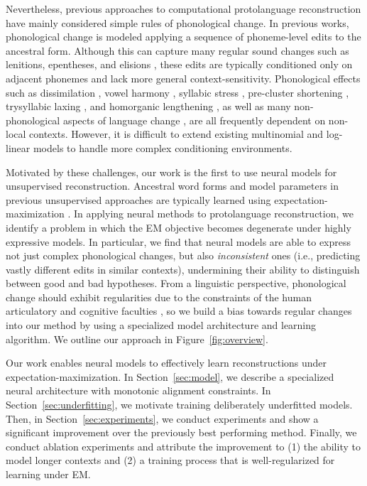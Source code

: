 \documentclass[11pt]{article}
\begin{document}
Nevertheless, previous approaches to computational protolanguage reconstruction have mainly considered simple rules of phonological change. In previous works, phonological change is modeled applying a sequence of phoneme-level edits to the ancestral form. Although this can capture many regular sound changes such as lenitions, epentheses, and elisions \citep{doi:10.1073/pnas.1204678110}, these edits are typically conditioned only on adjacent phonemes and lack more general context-sensitivity. Phonological effects such as dissimilation \citep{bye2011dissimilation}, vowel harmony \citep{nevins2010locality}, syllabic stress \citep{sen2012reconstructing}, pre-cluster shortening \citep{yip1987english}, trysyllabic laxing \citep{mohanan1982lexical}, and homorganic lengthening \citep{wena1998functional}, as well as many non-phonological aspects of language change \citep{fisiak2011historical}, are all frequently dependent on non-local contexts.
However, it is difficult to extend existing multinomial \citep{bouchard-etal-2007-probabilistic} and log-linear \citep{NIPS2007_7ce3284b, bouchard-cote-etal-2009-improved, doi:10.1073/pnas.1204678110} models to handle more complex conditioning environments.
 

Motivated by these challenges, our work is the first to use neural models for unsupervised reconstruction. 
Ancestral word forms and model parameters in previous unsupervised approaches are typically learned using expectation-maximization \citep[e.g.,][]{bouchard-etal-2007-probabilistic}. 
In applying neural methods to protolanguage reconstruction, we identify a problem in which the EM objective becomes degenerate under highly expressive models.
In particular, we find that neural models are able to express not just complex phonological changes, but also \textit{inconsistent} ones (i.e., predicting vastly different edits in similar contexts), undermining their ability to distinguish between good and bad hypotheses. 
From a linguistic perspective, phonological change should exhibit regularities due to the constraints of the human articulatory and cognitive faculties \citep{kiparsky1965phonological}, so we build a bias towards regular changes into our method by using a specialized model architecture and learning algorithm. We outline our approach in Figure~\ref{fig:overview}.


Our work enables neural models to effectively learn reconstructions under expectation-maximization.
In Section~\ref{sec:model}, we describe a specialized neural architecture with monotonic alignment constraints. In Section~\ref{sec:underfitting}, we motivate training deliberately underfitted models. Then, in Section~\ref{sec:experiments}, we conduct experiments and show a significant improvement over the previously best performing method. Finally, we conduct ablation experiments and attribute the improvement to (1) the ability to model longer contexts and (2) a training process that is well-regularized for learning under EM. 
\end{document}
